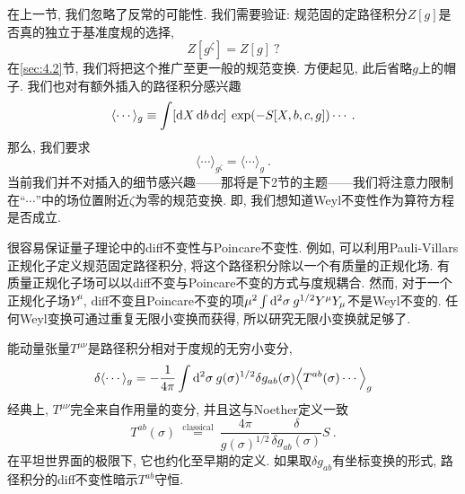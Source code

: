 在上一节, 我们忽略了反常的可能性. 我们需要验证: 规范固的定路径积分$Z[g]$是否真的独立于基准度规的选择, 
\begin{equation}
Z[g^{\zeta}]=Z[g]\:? \label{3.4.1}
\end{equation}
在\ref{sec:4.2}节, 我们将把这个推广至更一般的规范变换. 方便起见, 此后省略$g$上的帽子. 我们也对有额外插入的路径积分感兴趣
\begin{equation}
\langle\cdots\rangle_{g} \equiv \int[\mathrm{d} X\, \mathrm{d} b \, \mathrm{d} c] \:\exp (-S[X, b, c, g]) \cdots \:. \label{3.4.2}
\end{equation}
那么, 我们要求
\begin{equation}
\langle\cdots\rangle_{g ^\zeta}=\langle\cdots\rangle_{g} \:. \label{3.4.3}
\end{equation}
当前我们并不对插入的细节感兴趣——那将是下2节的主题——我们将注意力限制在“$\cdots$”中的场位置附近$\zeta$为零的规范变换. 即, 我们想知道Weyl不变性作为算符方程是否成立.

很容易保证量子理论中的diff不变性与Poincare不变性. 例如, 可以利用Pauli-Villars正规化子定义规范固定路径积分, 将这个路径积分除以一个有质量的正规化场. 有质量正规化子场可以以diff不变与Poincare不变的方式与度规耦合. 然而, 对于一个正规化子场$Y^\mu$, diff不变且Poincare不变的项$\mu^{2}\int \mathrm{d}^{2} \sigma\: g^{1/2} Y^{\mu} Y_{\mu}$不是Weyl不变的. 任何Weyl变换可通过重复无限小变换而获得, 所以研究无限小变换就足够了.

能动量张量$T^{\mu\nu}$是路径积分相对于度规的无穷小变分,
\begin{equation}\label{3.4.4}
\delta\langle\cdots\rangle_{g}=-\frac{1}{4 \pi} \int \mathrm{d}^{2} \sigma \: g(\sigma)^{1 / 2} \delta g_{a b}(\sigma)\Bigl\langle T^{a b}(\sigma) \cdots\Bigr\rangle_{g}
\end{equation}
经典上, $T^{\mu\nu}$完全来自作用量的变分, 并且这与Noether定义一致
\begin{equation}
T^{a b}(\sigma) \stackrel{\text { classical }}{=} \frac{4 \pi}{g(\sigma)^{1 / 2}} \frac{\delta}{\delta g_{a b}(\sigma)} S \:. \label{3.4.5}
\end{equation}
在平坦世界面的极限下, 它也约化至早期的定义. 如果取$\delta g_{a b}$有坐标变换的形式, 路径积分的diff不变性暗示$T^{ab}$守恒.

